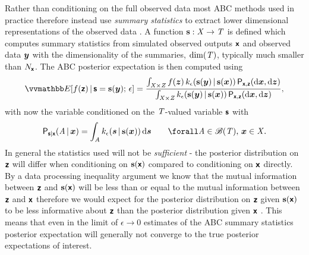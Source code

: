 Rather than conditioning on the full observed data most \ac{ABC} methods used in practice therefore instead use \emph{summary statistics} to extract lower dimensional representations of the observed data \citep{prangle2015summary}. A function ${\mathbf{s}} : \mathit{X} \to \mathit{T}$ is defined which computes summary statistics from simulated observed outputs $\boldsymbol{\mathsf{x}}$ and observed data $\boldsymbol{y}$ with the dimensionality of the summaries, $\dim({\mathit{T}})$, typically much smaller than $N_{\boldsymbol{\mathsf{x}}}$. The \ac{ABC} posterior expectation is then computed using
\begin{equation}
  \label{eq:abc-expectation-summary}
\begin{split}
  \expc{f(\rvct{z}) \gvn \rvct{s} = \vctfunc{s}(\vct{y});\,\epsilon} =
  \frac{
  \int_{\set{X}\times\set{Z}}
    f(\vct{z})\,k_{\epsilon}\lpa\vctfunc{s}(\vct{y})\gvn\vctfunc{s}(\vct{x})\rpa
  \,\prob{\rvct{x},\rvct{z}}(\dr\vct{x},\dr\vct{z})
  }
  {
  \int_{\set{X}\times\set{Z}}
    k_\epsilon\lpa\vctfunc{s}(\vct{y})\gvn\vctfunc{s}(\vct{x})\rpa\,
  \prob{\rvct{x},\rvct{z}}(\dr\vct{x},\dr\vct{z})
  },
\end{split}
\end{equation}
with now the variable conditioned on the $\mathit{T}$-valued variable $\boldsymbol{\mathsf{s}}$ with 
\begin{equation}\label{eq:abc-kernel-summary}
  \prob{\rvct{s}|\rvct{x}}\lpa \set{A} \gvn \vct{x} \rpa = 
  \int_{\set{A}} k_{\epsilon}(\vct{s}\gvn\vctfunc{s}(\vct{x})) \,\dr\vct{s}
  \qquad \forall \set{A} \in \borel(\set{T}),\,\vct{x}\in\set{X}.
\end{equation}
In general the statistics used will not be \emph{sufficient} - the posterior distribution on $\boldsymbol{\mathsf{z}}$ will differ when conditioning on ${\mathbf{s}}(\boldsymbol{\mathsf{x}})$ compared to conditioning on $\boldsymbol{\mathsf{x}}$ directly. By a data processing inequality argument we know that the mutual information between $\boldsymbol{\mathsf{z}}$ and ${\mathbf{s}}(\boldsymbol{\mathsf{x}})$ will be less than or equal to the mutual information between $\boldsymbol{\mathsf{z}}$ and $\boldsymbol{\mathsf{x}}$ therefore we would expect for the posterior distribution on $\boldsymbol{\mathsf{z}}$ given ${\mathbf{s}}(\boldsymbol{\mathsf{x}})$ to be less informative about $\boldsymbol{\mathsf{z}}$ than the posterior distribution given $\boldsymbol{\mathsf{x}}$ \citep{barnes2012considerate}. This means that even in the limit of $\epsilon \to 0$ estimates of the \ac{ABC} summary statistics posterior expectation will generally not converge to the true posterior expectations of interest. 

